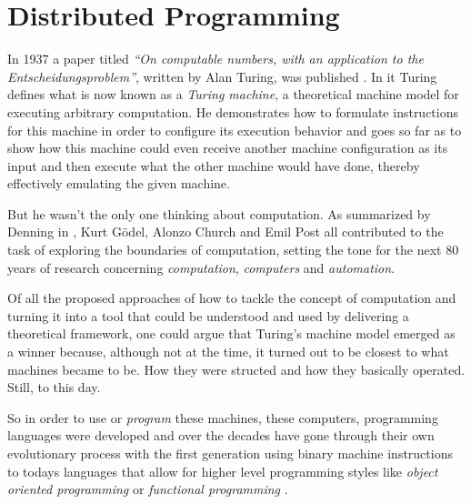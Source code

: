 \section{Distributed Programming}
In 1937 a paper titled \textit{``On computable numbers, with an
application to the Entscheidungsproblem''}, written by Alan Turing, was
published \cite{turingcomputable}. In it Turing defines what is now
known as a \textit{Turing machine}, a theoretical machine model for
executing arbitrary computation. He demonstrates how to formulate
instructions for this machine in order to configure its execution
behavior and goes so far as to show how this
machine could even receive another machine configuration as its input
and then execute what the other machine would have done, thereby
effectively emulating the given machine.

But he wasn't the only one thinking about computation. As summarized
by Denning in \cite{whatiscomputation}, Kurt Gödel, Alonzo Church and Emil
Post all contributed to the task of exploring the boundaries of
computation, setting the tone for the next 80 years of research
concerning \textit{computation}, \textit{computers} and \textit{automation}.
\newline


Of all the proposed approaches of how to tackle the concept of computation
and turning it into a tool that could be understood and used by delivering
a theoretical framework, one could argue that Turing's machine model
emerged as a winner because, although not at the time, it turned out
to be closest to what machines became to be. How they were structed and
how they basically operated. Still, to this day.

So in order to use or \textit{program} these machines, these computers,
programming languages were developed and over the decades have gone
through their own evolutionary process \cite{pl-gens} with the
first generation using binary machine instructions to todays languages
that allow for higher level programming styles like
\textit{object oriented programming } \cite{bjarneOO} or
\textit{functional programming} \cite{wadler-functional}.













































